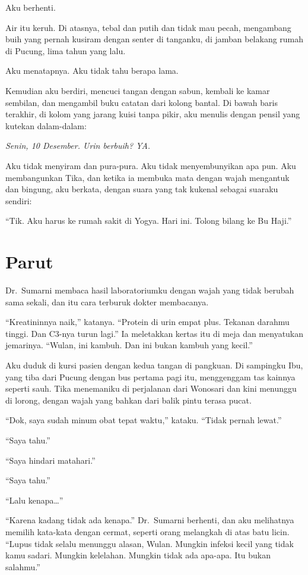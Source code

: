 \documentclass[11pt,twoside,openany]{book}
\begin{document}
Aku berhenti.

Air itu keruh. Di atasnya, tebal dan putih dan tidak mau pecah, mengambang buih yang pernah kusiram dengan senter di tanganku, di jamban belakang rumah di Pucung, lima tahun yang lalu.

Aku menatapnya. Aku tidak tahu berapa lama.

Kemudian aku berdiri, mencuci tangan dengan sabun, kembali ke kamar sembilan, dan mengambil buku catatan dari kolong bantal. Di bawah baris terakhir, di kolom yang jarang kuisi tanpa pikir, aku menulis dengan pensil yang kutekan dalam-dalam:

\emph{Senin, 10 Desember. Urin berbuih? YA.}

Aku tidak menyiram dan pura-pura. Aku tidak menyembunyikan apa pun. Aku membangunkan Tika, dan ketika ia membuka mata dengan wajah mengantuk dan bingung, aku berkata, dengan suara yang tak kukenal sebagai suaraku sendiri:

``Tik. Aku harus ke rumah sakit di Yogya. Hari ini. Tolong bilang ke Bu Haji.''

\chapter{Parut}
Dr.~Sumarni membaca hasil laboratoriumku dengan wajah yang tidak berubah sama sekali, dan itu cara terburuk dokter membacanya.

``Kreatininnya naik,'' katanya. ``Protein di urin empat plus. Tekanan darahmu tinggi. Dan C3-nya turun lagi.'' Ia meletakkan kertas itu di meja dan menyatukan jemarinya. ``Wulan, ini kambuh. Dan ini bukan kambuh yang kecil.''

Aku duduk di kursi pasien dengan kedua tangan di pangkuan. Di sampingku Ibu, yang tiba dari Pucung dengan bus pertama pagi itu, menggenggam tas kainnya seperti sauh. Tika menemaniku di perjalanan dari Wonosari dan kini menunggu di lorong, dengan wajah yang bahkan dari balik pintu terasa pucat.

``Dok, saya sudah minum obat tepat waktu,'' kataku. ``Tidak pernah lewat.''

``Saya tahu.''

``Saya hindari matahari.''

``Saya tahu.''

``Lalu kenapa\ldots{}''

``Karena kadang tidak ada kenapa.'' Dr.~Sumarni berhenti, dan aku melihatnya memilih kata-kata dengan cermat, seperti orang melangkah di atas batu licin. ``Lupus tidak selalu menunggu alasan, Wulan. Mungkin infeksi kecil yang tidak kamu sadari. Mungkin kelelahan. Mungkin tidak ada apa-apa. Itu bukan salahmu.''
\end{document}
